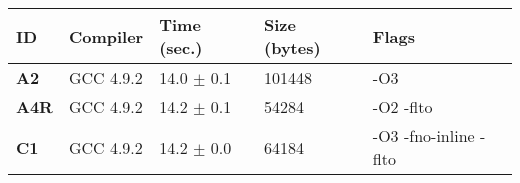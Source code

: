     \begin{tabular}{|l|l|l|l|p{3.2in}|}
     \hline
      \textbf{ID} & \textbf{Compiler} & \textbf{Time (sec.)} & \textbf{Size (bytes)} & \textbf{Flags} \\ 
     \hline
      \textbf{ A2 } &  GCC 4.9.2  &  14.0 $\pm$ 0.1  &  101448  & {\small -O3 }\\
     \hline
      \textbf{ A4R } &  GCC 4.9.2  &  14.2 $\pm$ 0.1  &  54284  & {\small -O2 -flto }\\
     \hline
      \textbf{ C1 } &  GCC 4.9.2  &  14.2 $\pm$ 0.0  &  64184  & {\small -O3 -fno-inline -flto }\\
     \hline
    \end{tabular}    